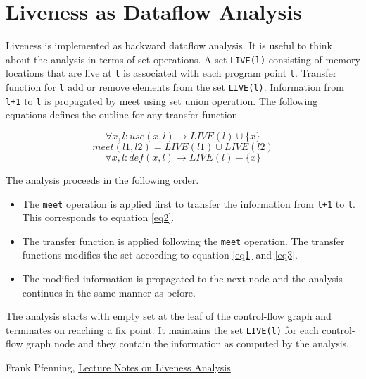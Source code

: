 \documentclass{article}
\begin{document}
\section{Liveness as Dataflow Analysis}
Liveness is implemented as backward dataflow analysis. It is useful to think about the analysis in terms of set operations. A set \texttt{LIVE(l)} consisting of memory locations that are live at \texttt{l} is associated with each program point \texttt{l}. Transfer function for \texttt{l} add or remove elements from the set \texttt{LIVE(l)}. Information from \texttt{l+1} to \texttt{l} is propagated by meet using set union operation. The following equations defines the outline for any transfer function.

\begin{equation}
\label{eq1}
\forall x, l:  use(x,l) \to LIVE(l) \cup \{x\}
\end{equation}
\begin{equation}
\label{eq2}
meet(l1, l2) = LIVE(l1) \cup LIVE(l2)
\end{equation}
\begin{equation}
\label{eq3}
\forall x,l: def(x,l) \to LIVE(l) - \{x\}
\end{equation}

The analysis proceeds in the following order. 
\begin{itemize}
\item The \texttt{meet} operation is applied first to transfer the information from \texttt{l+1} to \texttt{l}. This corresponds to equation \ref{eq2}. 
\item The transfer function is applied following the \texttt{meet} operation. The transfer functions modifies the set according to equation \ref{eq1} and \ref{eq3}. 
\item The modified information is propagated to the next node and the analysis continues in the same manner as before. 
\end{itemize}
The analysis starts with empty set at the leaf of the control-flow graph and terminates on reaching a fix point. It maintains the set \texttt{LIVE(l)} for each control-flow graph node and they contain the information as computed by the analysis.

\begin{thebibliography}{1}
Frank Pfenning,
\href{http://www.cs.cmu.edu/~fp/courses/15411-f08/lectures/04-liveness.pdf} {Lecture Notes on Liveness Analysis}

\end{thebibliography}
\end{document}
